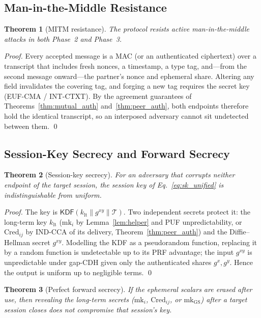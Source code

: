 \documentclass[11pt,a4paper]{article}
\newtheorem{theorem}{Theorem}
\begin{document}
\subsection{Man-in-the-Middle Resistance}

\begin{theorem}[MITM resistance]
\label{thm:mitm}
The protocol resists active man-in-the-middle attacks in both Phase~2 and
Phase~3.
\end{theorem}

\begin{proof}
Every accepted message is a MAC (or an authenticated ciphertext) over a
transcript that includes fresh nonces, a timestamp, a type tag, and---from the
second message onward---the partner's nonce and ephemeral share. Altering any
field invalidates the covering tag, and forging a new tag requires the secret
key (EUF-CMA / INT-CTXT). By the agreement guarantees of
Theorems~\ref{thm:mutual_auth} and~\ref{thm:peer_auth}, both endpoints therefore
hold the identical transcript, so an interposed adversary cannot sit undetected
between them. \qed
\end{proof}

\subsection{Session-Key Secrecy and Forward Secrecy}

\begin{theorem}[Session-key secrecy]
\label{thm:key_secrecy}
For an adversary that corrupts neither endpoint of the target session, the
session key of Eq.~\eqref{eq:sk_unified} is indistinguishable from uniform.
\end{theorem}

\begin{proof}
The key is $\mathsf{KDF}(k_{\text{lt}}\|g^{xy}\|\mathcal{T})$. Two independent
secrets protect it: the long-term key $k_{\text{lt}}$
($\text{mk}_i$ by Lemma~\ref{lem:helper} and PUF unpredictability, or
$\text{Cred}_{ij}$ by IND-CCA of its delivery, Theorem~\ref{thm:peer_auth}) and
the Diffie--Hellman secret $g^{xy}$. Modelling the KDF as a pseudorandom
function, replacing it by a random function is undetectable up to its PRF
advantage; the input $g^{xy}$ is unpredictable under gap-CDH given only the
authenticated shares $g^{x},g^{y}$. Hence the output is uniform up to negligible
terms. \qed
\end{proof}

\begin{theorem}[Perfect forward secrecy]
\label{thm:pfs}
If the ephemeral scalars are erased after use, then revealing the long-term
secrets ($\text{mk}_i$, $\text{Cred}_{ij}$, or $\text{mk}_{\text{GS}}$)
\emph{after} a target session closes does not compromise that session's key.
\end{theorem}
\end{document}

